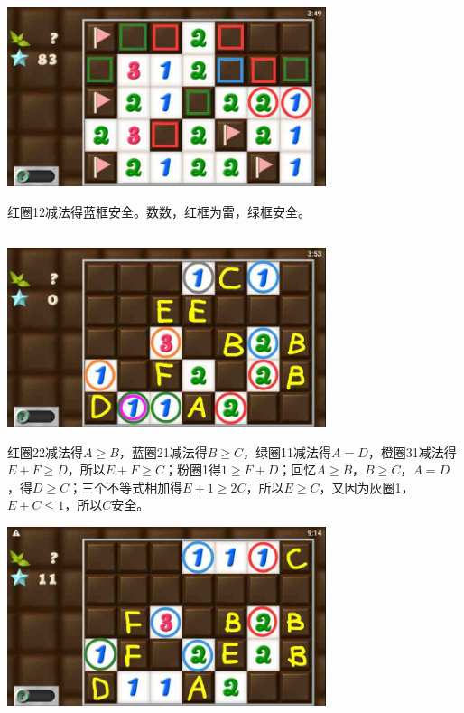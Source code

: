 \begin{center}
    \includegraphics[width=0.7\textwidth]{puzzlelow/233-4.jpg}
\end{center}
红圈12减法得蓝框安全。数数，红框为雷，绿框安全。

\subsection{} %
\begin{center}
    \includegraphics[width=0.7\textwidth]{puzzlelow/234-1.jpg}
\end{center}
红圈22减法得$A\ge B$，蓝圈21减法得$B\ge C$，绿圈11减法得$A=D$，橙圈31减法得$E+F\ge D$，所以$E+F\ge C$；粉圈1得$1\ge F+D$；回忆$A\ge B$，$B\ge C$，$A=D$，得$D\ge C$；三个不等式相加得$E+1\ge 2C$，所以$E\ge C$，又因为灰圈1，$E+C\le 1$，所以$C$安全。
\begin{center}
    \includegraphics[width=0.7\textwidth]{puzzlelow/234-2.jpg}
\end{center}
